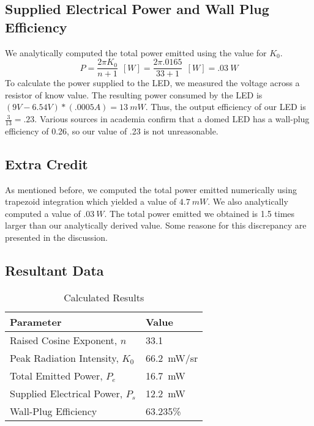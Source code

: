 \subsection{Supplied Electrical Power and Wall Plug Efficiency}
We analytically computed the total power emitted using the value for $K_0$.
\[P = \frac{2 \pi K_{0}}{n+1}\: \: [W] =  \frac{2 \pi .0165} {33+1}\: \: [W] = \SI{.03}{W}\]
To calculate the power supplied to the LED, we measured the voltage across a resistor of know value. The resulting power consumed by the LED is $(9V - 6.54V)*(.0005A) = \SI{13}{mW}$. 
Thus, the output efficiency of our LED is $\frac{3}{13} = .23$. Various sources in academia confirm that a domed LED has a wall-plug efficiency of 0.26, so our value of .23 is not unreasonable.

\subsection{Extra Credit}
As mentioned before, we computed the total power emitted numerically using trapezoid integration which yielded a value of $\SI{4.7}{mW}$. We also analytically computed a value of $ \SI{.03}{W}$. The total power emitted we obtained is 1.5 times larger than our analytically derived value. Some reasone for this discrepancy are presented in the discussion.
\subsection{Resultant Data}

\begin{table}[!htb]
\caption{Calculated Results} \label{tab:calc_results}
\bigskip
\centering
\begin{tabular}{l|l}
\rowcolor[HTML]{C0C0C0} 
\textbf{Parameter} & \textbf{Value} \\ \hline
Raised Cosine Exponent, $n$ & 33.1 \\
Peak Radiation Intensity, $K_0$ & \SI{66.2}{mW/sr} \\
Total Emitted Power, $P_e$ & \SI{16.7}{mW} \\
Supplied Electrical Power, $P_s$ & \SI{12.2}{mW} \\
Wall-Plug Efficiency & 63.235\%
\end{tabular}
\end{table}

